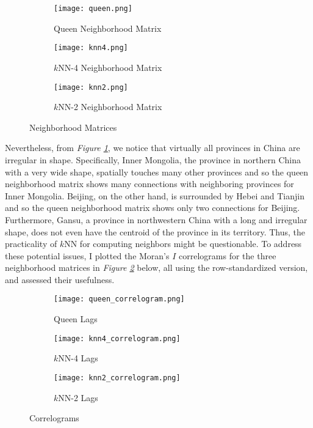 \documentclass{article}
\begin{document}
\begin{figure}[htbp]
    \begin{subfigure}[b]{0.3\textwidth}
        \centering
        \texttt{[image: queen.png]}
        \caption{Queen Neighborhood Matrix}
    \end{subfigure}
    \hfill
    \begin{subfigure}[b]{0.3\textwidth}
        \centering
        \texttt{[image: knn4.png]}
        \caption{\(k\)NN-4 Neighborhood Matrix}
    \end{subfigure}
    \hfill
    \begin{subfigure}[b]{0.3\textwidth}
        \centering
        \texttt{[image: knn2.png]}
        \caption{\(k\)NN-2 Neighborhood Matrix}
    \end{subfigure}
    \caption{Neighborhood Matrices}
    \label{fig:neighborhood_matrices}
\end{figure}

Nevertheless, from \textit{Figure \ref{fig:neighborhood_matrices}}, we notice that virtually all provinces in China are irregular in shape. Specifically, Inner Mongolia, the province in northern China with a very wide shape, spatially touches many other provinces and so the queen neighborhood matrix shows many connections with neighboring provinces for Inner Mongolia. Beijing, on the other hand, is surrounded by Hebei and Tianjin and so the queen neighborhood matrix shows only two connections for Beijing. Furthermore, Gansu, a province in northwestern China with a long and irregular shape, does not even have the centroid of the province in its territory. Thus, the practicality of \(k\)NN for computing neighbors might be questionable. To address these potential issues, I plotted the Moran's \(I\) correlograms for the three neighborhood matrices in \textit{Figure \ref{fig:correlograms}} below, all using the row-standardized version, and assessed their usefulness.

\begin{figure}[htbp]
    \begin{subfigure}[b]{0.3\textwidth}
        \centering
        \texttt{[image: queen\_correlogram.png]}
        \caption{Queen Lags}
    \end{subfigure}
    \hfill
    \begin{subfigure}[b]{0.3\textwidth}
        \centering
        \texttt{[image: knn4\_correlogram.png]}
        \caption{\(k\)NN-4 Lags}
    \end{subfigure}
    \hfill
    \begin{subfigure}[b]{0.3\textwidth}
        \centering
        \texttt{[image: knn2\_correlogram.png]}
        \caption{\(k\)NN-2 Lags}
    \end{subfigure}
    \caption{Correlograms}
    \label{fig:correlograms}
\end{figure}
\end{document}
